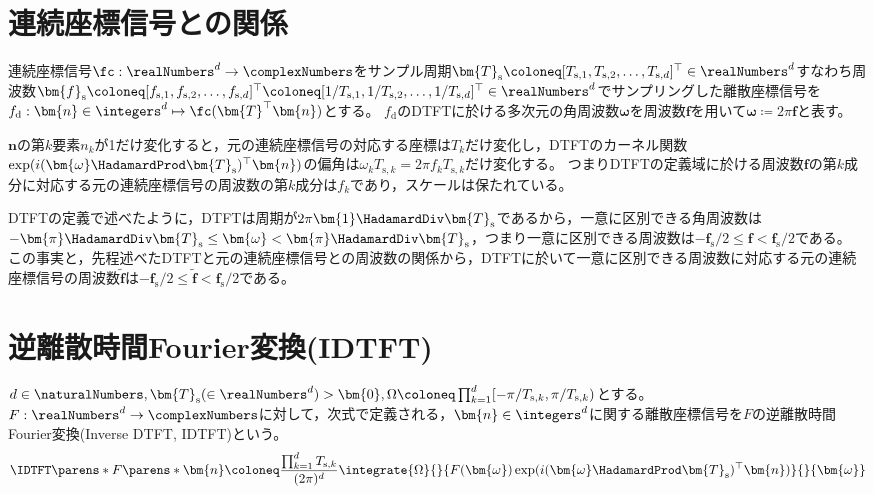     \section{連続座標信号との関係}
        連続座標信号$\fc:\realNumbers^d\to\complexNumbers$をサンプル周期$\bm{T}_\mathrm{s} \coloneq [T_{\mathrm{s},1}, T_{\mathrm{s},2}, \dotsc, T_{\mathrm{s},d}]^\top\in\realNumbers^d$すなわち周波数$\bm{f}_\mathrm{s} \coloneq [f_{\mathrm{s},1}, f_{\mathrm{s},2}, \dotsc, f_{\mathrm{s},d}]^\top \coloneq [1/T_{\mathrm{s},1}, 1/T_{\mathrm{s},2}, \dotsc, 1/T_{\mathrm{s},d}]^\top\in\realNumbers^d$でサンプリングした離散座標信号を$f_\mathrm{d}: \bm{n}\in\integers^d\mapsto \fc(\bm{T}^\top\bm{n})$とする。
        $f_\mathrm{d}$のDTFTに於ける多次元の角周波数$\bm{\omega}$を周波数$\bm{f}$を用いて$\bm{\omega} \coloneq 2\pi\bm{f}$と表す。
        \par
        $\bm{n}$の第$k$要素$n_k$が1だけ変化すると，元の連続座標信号の対応する座標は$T_k$だけ変化し，DTFTのカーネル関数$\exp(i(\bm{\omega}\HadamardProd\bm{T}_\mathrm{s})^\top\bm{n})$の偏角は$\omega_k T_{\mathrm{s},k} = 2\pi f_k T_{\mathrm{s},k}$だけ変化する。
        つまりDTFTの定義域に於ける周波数$\bm{f}$の第$k$成分に対応する元の連続座標信号の周波数の第$k$成分は$f_k$であり，スケールは保たれている。
        \par
        DTFTの定義で述べたように，DTFTは周期が$2\pi\bm{1}\HadamardDiv\bm{T}_\mathrm{s}$であるから，一意に区別できる角周波数は$-\bm{\pi}\HadamardDiv\bm{T}_\mathrm{s} \leq \bm{\omega} < \bm{\pi}\HadamardDiv\bm{T}_\mathrm{s}$，つまり一意に区別できる周波数は$-\bm{f}_\mathrm{s}/2 \leq \bm{f} < \bm{f}_\mathrm{s}/2$である。
        この事実と，先程述べたDTFTと元の連続座標信号との周波数の関係から，DTFTに於いて一意に区別できる周波数に対応する元の連続座標信号の周波数$\tilde{\bm{f}}$は$-\bm{f}_\mathrm{s}/2 \leq \tilde{\bm{f}} < \bm{f}_\mathrm{s}/2$である。
    \section{逆離散時間Fourier変換(IDTFT)}
        $d\in\naturalNumbers,\bm{T}_\mathrm{s}(\in\realNumbers^d)>\bm{0},\Omega \coloneq \prod_{k=1}^d [-\pi/T_{\mathrm{s},k},\pi/T_{\mathrm{s},k})$とする。
        $F:\realNumbers^d\to\complexNumbers$に対して，次式で定義される，$\bm{n}\in\integers^d$に関する離散座標信号を$F$の逆離散時間Fourier変換(Inverse DTFT, IDTFT)という。
        \[ \IDTFT\parens*{F}\parens*{\bm{n}} \coloneq \frac{\prod_{k=1}^d T_{\mathrm{s},k}}{(2\pi)^d}\integrate{\Omega}{}{F(\bm{\omega})\exp(i(\bm{\omega}\HadamardProd\bm{T}_\mathrm{s})^\top\bm{n})}{}{\bm{\omega}} \]
